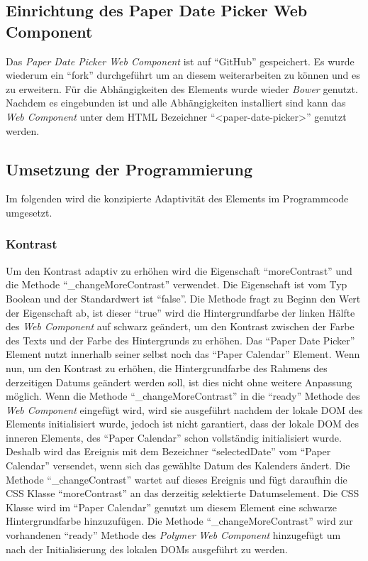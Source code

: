 \documentclass[12pt, paper=a4, bibtotoc, toc=listof, headsepline=true]{scrreprt}
\begin{document}
		\subsection{Einrichtung des Paper Date Picker Web Component}
		Das \emph{Paper Date Picker Web Component} ist auf \enquote{GitHub} gespeichert. Es wurde wiederum ein \enquote{fork} durchgeführt um an diesem weiterarbeiten zu können und es zu erweitern. Für die Abhängigkeiten des Elements wurde wieder \emph{Bower} genutzt. Nachdem es eingebunden ist und alle Abhängigkeiten installiert sind kann das \emph{Web Component} unter dem \ac{HTML} Bezeichner \enquote{<paper-date-picker>} genutzt werden.
		\subsection{Umsetzung der Programmierung}
		Im folgenden wird die konzipierte Adaptivität des Elements im Programmcode umgesetzt. 
		\subsubsection{Kontrast}
		Um den Kontrast adaptiv zu erhöhen wird die Eigenschaft \enquote{moreContrast} und die Methode \enquote{\_changeMoreContrast} verwendet. Die Eigenschaft ist vom Typ Boolean und der Standardwert ist \enquote{false}. Die Methode fragt zu Beginn den Wert der Eigenschaft ab, ist dieser \enquote{true} wird die Hintergrundfarbe der linken Hälfte des \emph{Web Component} auf schwarz geändert, um den Kontrast zwischen der Farbe des Texts und der Farbe des Hintergrunds zu erhöhen. Das \enquote{Paper Date Picker} Element nutzt innerhalb seiner selbst noch das \enquote{Paper Calendar} Element. Wenn nun, um den Kontrast zu erhöhen, die Hintergrundfarbe des Rahmens des derzeitigen Datums geändert werden soll, ist dies nicht ohne weitere Anpassung möglich. Wenn die Methode \enquote{\_changeMoreContrast} in die \enquote{ready} Methode des \emph{Web Component} eingefügt wird, wird sie ausgeführt nachdem der lokale \ac{DOM} des Elements initialisiert wurde, jedoch ist nicht garantiert, dass der lokale \ac{DOM} des inneren Elements, des \enquote{Paper Calendar} schon vollständig initialisiert wurde. Deshalb wird das Ereignis mit dem Bezeichner \enquote{selectedDate} vom \enquote{Paper Calendar} versendet, wenn sich das gewählte Datum des Kalenders ändert. Die Methode \enquote{\_changeContrast} wartet auf dieses Ereignis und fügt daraufhin die \ac{CSS} Klasse \enquote{moreContrast} an das derzeitig selektierte Datumselement. Die \ac{CSS} Klasse wird im \enquote{Paper Calendar} genutzt um diesem Element eine schwarze Hintergrundfarbe hinzuzufügen. Die Methode \enquote{\_changeMoreContrast} wird zur vorhandenen \enquote{ready} Methode des \emph{Polymer} \emph{Web Component} hinzugefügt um nach der Initialisierung des lokalen \ac{DOM}s ausgeführt zu werden.
\end{document}
